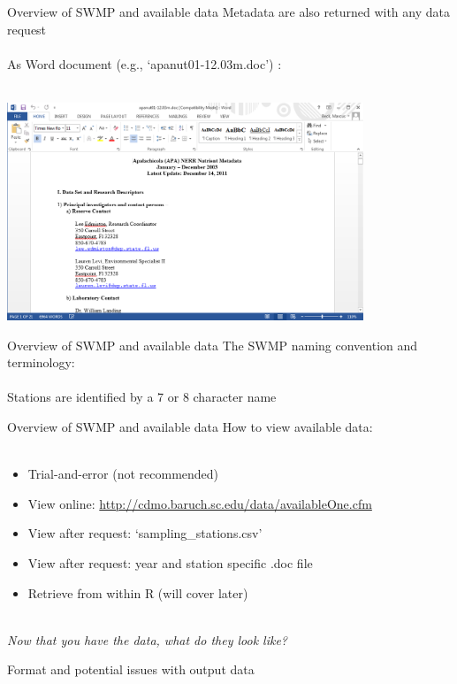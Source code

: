 \documentclass[xcolor=svgnames]{beamer}\usepackage[]{graphicx}\usepackage[]{color}
\begin{document}
\begin{frame}[t]{Overview of SWMP and available data}
Metadata are also returned with any data request\\~\\
As Word document (e.g., `apanut01-12.03m.doc') :\\~\\
\centerline{\includegraphics[width = 0.8\textwidth]{meta_doc.png}}
\end{frame}

\begin{frame}{Overview of SWMP and available data}
The SWMP naming convention and terminology:\\~\\
Stations are identified by a 7 or 8 character name

\end{frame}

\begin{frame}{Overview of SWMP and available data}
\onslide<+->
How to view available data:\\~\\
\begin{itemize}
\item Trial-and-error (not recommended)
\item View online: \href{http://cdmo.baruch.sc.edu/data/availableOne.cfm}{http://cdmo.baruch.sc.edu/data/availableOne.cfm}
\item View after request: `sampling_stations.csv'
\item View after request: year and station specific .doc file
\item Retrieve from within R (will cover later) \\~\\
\end{itemize}
\onslide<+->
\centerline{\emph{Now that you have the data, what do they look like?}} 
\end{frame}

\begin{frame}{Format and potential issues with output data}

\end{frame}

\begin{frame}

\end{frame}

\begin{frame}

\end{frame}

\begin{frame}

\end{frame}

\begin{frame}

\end{frame}
\end{document}
